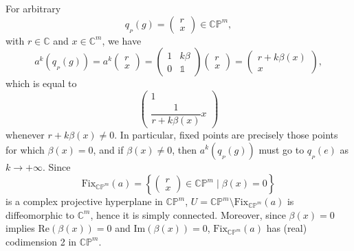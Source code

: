 \documentclass[pdftex]{sigma}
\numberwithin{equation}{section}
\theoremstyle{definition}
\begin{document}
For arbitrary \[q_{{}_P}(g)=\begin{pmatrix}r \\ x\end{pmatrix}\in\mathbb{CP}^m,\] with $r\in\mathbb{C}$ and $x\in\mathbb{C}^m$, we have \[a^k(q_{{}_P}(g))=a^k\begin{pmatrix}r \\ x\end{pmatrix}=\begin{pmatrix}1 & k\beta \\ 0 & \mathds{1}\end{pmatrix}\begin{pmatrix}r \\ x\end{pmatrix}=\begin{pmatrix}r+k\beta(x) \\ x\end{pmatrix},\] which is equal to \[\begin{pmatrix}1 \\ \dfrac{1}{r+k\beta(x)}x\end{pmatrix}\] whenever $r+k\beta(x)\neq 0$. In particular, fixed points are precisely those points for which $\beta(x)=0$, and if $\beta(x)\neq 0$, then $a^k(q_{{}_P}(g))$ must go to $q_{{}_P}(e)$ as $k\rightarrow +\infty$. Since
\[\mathrm{Fix}_{\mathbb{CP}^m}(a)=\left\{\begin{pmatrix}r \\ x\end{pmatrix}\in\mathbb{CP}^m\mid \beta(x)=0\right\}\]
is a complex projective hyperplane in $\mathbb{CP}^m$, $U=\mathbb{CP}^m\setminus\mathrm{Fix}_{\mathbb{CP}^m}(a)$ is diffeomorphic to $\mathbb{C}^m$, hence it is simply connected. Moreover, since $\beta(x)=0$ implies $\mathrm{Re}(\beta(x))=0$ and $\mathrm{Im}(\beta(x))=0$, $\mathrm{Fix}_{\mathbb{CP}^m}(a)$ has (real) codimension 2 in $\mathbb{CP}^m$.
\end{document}
